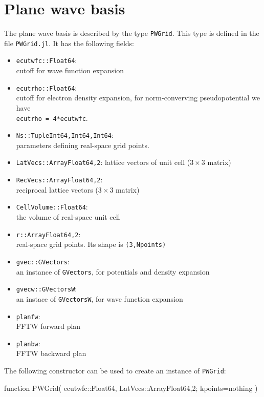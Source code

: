 \documentclass[a4paper,12pt]{article}
\newcommand{\jlcode}[1]{\texttt{#1}}
\begin{document}
\section{Plane wave basis}

The plane wave basis is described by the type \jlcode{PWGrid}.
This type is defined in the file \jlcode{PWGrid.jl}. It has the following fields:
\begin{itemize}
%
\item \jlcode{ecutwfc::Float64}:\\
  cutoff for wave function expansion
%
\item \jlcode{ecutrho::Float64}:\\
  cutoff for electron density
  expansion, for norm-converving
  pseudopotential we have \\
  \jlcode{ecutrho = 4*ecutwfc}.
%
\item \jlcode{Ns::Tuple{Int64,Int64,Int64}}:\\
  parameters defining real-space grid points.
%
\item \jlcode{LatVecs::Array{Float64,2}}: lattice vectors of
unit cell ($3\times3$ matrix)
%
\item \jlcode{RecVecs::Array{Float64,2}}:\\
  reciprocal lattice vectors ($3\times3$ matrix)
%
\item \jlcode{CellVolume::Float64}:\\
  the volume of real-space unit cell
%
\item \jlcode{r::Array{Float64,2}}:\\
  real-space grid points.
  Its shape is \jlcode{(3,Npoints)}
%
\item \jlcode{gvec::GVectors}:\\
  an instance of \jlcode{GVectors},
  for potentials and density expansion
%
\item \jlcode{gvecw::GVectorsW}:\\
  an instace of \jlcode{GVectorsW}, for wave function expansion
%
\item \jlcode{planfw}:\\
  FFTW forward plan
%
\item \jlcode{planbw}:\\
  FFTW backward plan
%
\end{itemize}

The following constructor can be used to create an instance of
\jlcode{PWGrid}:

\begin{juliacode}
function PWGrid( ecutwfc::Float64,
                 LatVecs::Array{Float64,2};
                 kpoints=nothing )
\end{juliacode}
\end{document}
